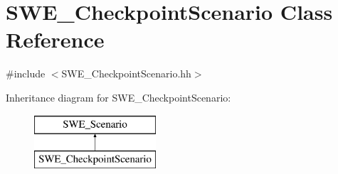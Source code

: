 \hypertarget{classSWE__CheckpointScenario}{\section{S\-W\-E\-\_\-\-Checkpoint\-Scenario Class Reference}
\label{classSWE__CheckpointScenario}
}


{\ttfamily \#include $<$S\-W\-E\-\_\-\-Checkpoint\-Scenario.\-hh$>$}

Inheritance diagram for S\-W\-E\-\_\-\-Checkpoint\-Scenario\-:\begin{figure}[H]
\begin{center}
\leavevmode
\includegraphics[height=2.000000cm]{classSWE__CheckpointScenario}
\end{center}
\end{figure}
